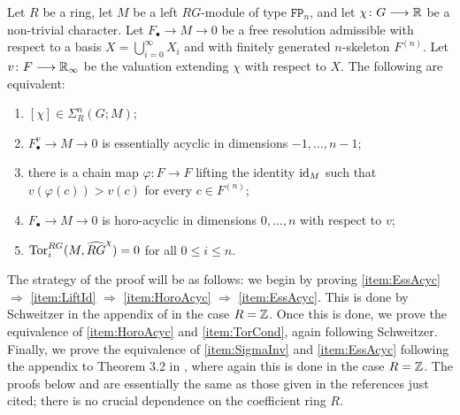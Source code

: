 \documentclass[11pt, letterpaper]{amsart}
\begin{document}
\begin{thm} \label{thm:Main}
Let $R$ be a ring, let $M$ be a left $RG$-module of type $\mathtt{FP}_n$, and let $\chi \colon G \longrightarrow \mathbb{R}$ be a non-trivial character. Let $F_\bullet \longrightarrow M \longrightarrow 0$ be a free resolution admissible with respect to a basis $X = \bigcup_{i = 0}^\infty X_i$ and with finitely generated $n$-skeleton $F^{(n)}$. Let $v \colon F \longrightarrow \mathbb{R}_\infty$ be the valuation extending $\chi$ with respect to $X$. The following are equivalent:
\begin{enumerate}[label=(\arabic*)]
    \item\label{item:SigmaInv} $[\chi] \in \Sigma_R^n(G;M)$;
    \item\label{item:EssAcyc} $F_\bullet^v \longrightarrow M \longrightarrow 0$ is essentially acyclic in dimensions $-1, \dots, n-1$;
    \item\label{item:LiftId} there is a chain map $\varphi \colon F \longrightarrow F$ lifting the identity $\operatorname{id}_M$ such that $v(\varphi(c)) > v(c)$ for every $c \in F^{(n)}$;
    \item\label{item:HoroAcyc} $F_\bullet \longrightarrow M \longrightarrow 0$ is horo-acyclic in dimensions $0, \dots, n$ with respect to $v$;
    \item\label{item:TorCond} $\operatorname{Tor}_i^{RG}(M, \widehat{RG}^\chi) = 0$ for all $0 \leqslant i \leqslant n$.
\end{enumerate}
\end{thm}



The strategy of the proof will be as follows: we begin by proving \ref{item:EssAcyc} $\Longrightarrow$ \ref{item:LiftId} $\Longrightarrow$ \ref{item:HoroAcyc} $\Longrightarrow$ \ref{item:EssAcyc}. This is done by  Schweitzer in the appendix of \cite{BieriDeficiency} in the case $R = \mathbb{Z}$. Once this is done, we prove the equivalence of \ref{item:HoroAcyc} and \ref{item:TorCond}, again following Schweitzer. Finally, we prove the equivalence of \ref{item:SigmaInv} and \ref{item:EssAcyc} following the appendix to Theorem 3.2 in \cite{BieriRenzValutations}, where again this is done in the case $R = \mathbb{Z}$. The proofs below and are essentially the same as those given in the references just cited; there is no crucial dependence on the coefficient ring $R$.
\end{document}
